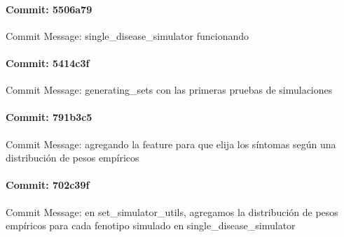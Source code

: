\documentclass{article}
\begin{document}
\paragraph{Commit: 5506a79}
Commit Message: single_disease_simulator funcionando

\paragraph{Commit: 5414c3f}
Commit Message: generating_sets con las primeras pruebas de simulaciones

\paragraph{Commit: 791b3c5}
Commit Message: agregando la feature para que elija los síntomas según una distribución de pesos empíricos

\paragraph{Commit: 702c39f}
Commit Message: en set_simulator_utils, agregamos la distribución de pesos empíricos para cada fenotipo simulado en single_disease_simulator

\end{document}
